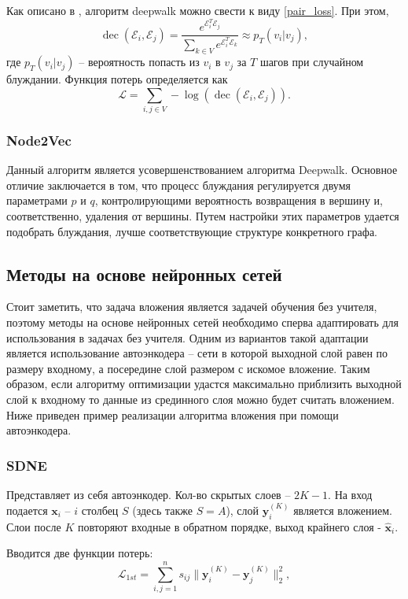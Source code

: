 \documentclass[12pt,a4paper]{extarticle}
\newcommand{\E}{\mathcal{E}}
\newcommand{\Loss}{\mathcal{L}}
\newcommand{\decoder}{\operatorname{dec}}
\begin{document}
    Как описано в \cite{survey2}, алгоритм deepwalk можно свести к виду \eqref{pair_loss}. При этом,
    \[
    \decoder(\E_i, \E_j) = \frac{e^{\E_i^T\E_j}}{\sum_{k \in V} e^{\E_i^T\E_k}} \approx p_T(v_i | v_j),
    \]
    где $p_T(v_i | v_j)$ -- вероятность попасть из $v_i$ в $v_j$ за $T$ шагов при случайном блуждании. Функция потерь определяется как
    \[
    \Loss = \sum_{i, j \in V} -\log(\decoder(\E_i, \E_j)).
    \]
    
    \subsubsection{Node2Vec \cite{node2vec}}
    Данный алгоритм является усовершенствованием алгоритма Deepwalk.
    Основное отличие заключается в том, что процесс блуждания регулируется двумя параметрами $p$ и $q$, контролирующими вероятность возвращения в вершину и, соответственно, удаления от вершины.
    Путем настройки этих параметров удается подобрать блуждания, лучше соответствующие структуре конкретного графа.
    
    \subsection{Методы на основе нейронных сетей}
    Стоит заметить, что задача вложения является задачей обучения без учителя, поэтому методы на основе нейронных сетей необходимо сперва адаптировать для использования в задачах без учителя.
    Одним из вариантов такой адаптации является использование автоэнкодера -- сети в которой выходной слой равен по размеру входному, а посередине слой размером с искомое вложение.
    Таким образом, если алгоритму оптимизации удастся максимально приблизить выходной слой к входному то данные из срединного слоя можно будет считать вложением.
    Ниже приведен пример реализации алгоритма вложения при помощи автоэнкодера.
    
    \subsubsection{SDNE \cite{sdne}}
    
    Представляет из себя автоэнкодер. Кол-во скрытых слоев -- $2K - 1$. На вход подается $\mathbf{x}_i$ -- $i$ столбец $S$ (здесь также $S = A$), слой $\mathbf{y}_i^{(K)}$ является вложением. Слои после $K$ повторяют входные в обратном порядке, выход крайнего слоя - $\mathbf{\hat{x}}_i$.
    
    Вводится две функции потерь:
    $$
    \Loss_{1st} = \sum_{i,j=1}^{n} s_{ij} \lVert \mathbf{y}_i^{(K)} - \mathbf{y}_j^{(K)} \rVert_2^2,
    $$
    
\end{document}
